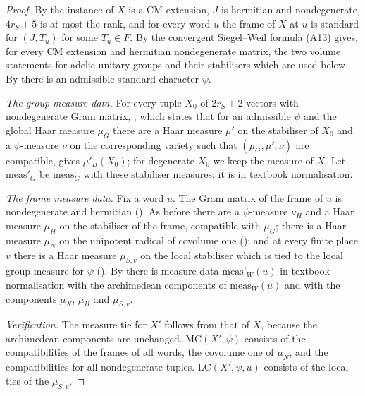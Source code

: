 \begin{proof}
By  the instance of $X$ is a CM extension,
$J$ is hermitian and nondegenerate, $4r_S+5$ is at most the rank, and for every word $u$ the frame of $X$ at $u$ is
standard for $(J,T_u)$ for some $T_u\in F$. By  the convergent
Siegel--Weil formula (A13) gives, for every CM extension and hermitian nondegenerate matrix, the two volume statements
for adelic unitary groups and their stabilisers which are used below. By
 there is an admissible standard character $\psi$.

\emph{The group measure data.} For every tuple $X_0$ of $2r_S+2$ vectors with nondegenerate Gram matrix,
, which states that for an admissible $\psi$ and the
global Haar measure $\mu_G$ there are a Haar measure $\mu'$ on the stabiliser of $X_0$ and a $\psi$-measure $\nu$ on the
corresponding variety such that $(\mu_G,\mu',\nu)$ are compatible, gives $\mu'_B(X_0)$; for degenerate $X_0$ we keep the
measure of $X$. Let $\mathrm{meas}'_G$ be $\mathrm{meas}_G$ with these stabiliser measures; it is in textbook
normalisation.

\emph{The frame measure data.} Fix a word $u$. The Gram matrix of the frame of $u$ is nondegenerate and hermitian
(). As before there are a $\psi$-measure $\nu_H$ and a Haar measure $\mu_H$
on the stabiliser of the frame, compatible with $\mu_G$; there is a Haar measure $\mu_N$ on the unipotent radical of
covolume one (); and at every finite place
$v$ there is a Haar measure $\mu_{S,v}$ on the local stabiliser which is tied to the local group measure for $\psi$
(). By
 there is measure data $\mathrm{meas}'_W(u)$ in textbook
normalisation with the archimedean components of $\mathrm{meas}_W(u)$ and with the components $\mu_N$, $\mu_H$ and
$\mu_{S,v}$.

\emph{Verification.} The measure tie for $X'$ follows from that of $X$, because the archimedean components are
unchanged. $\mathrm{MC}(X',\psi)$ consists of the compatibilities of the frames of all words, the covolume one of
$\mu_N$, and the compatibilities for all nondegenerate tuples. $\mathrm{LC}(X',\psi,u)$ consists of the local ties of
the $\mu_{S,v}$.
\end{proof}

